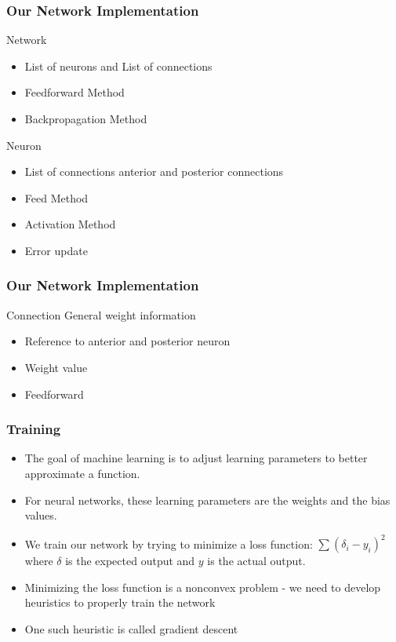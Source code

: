\documentclass{beamer}
\begin{document}
\begin{frame}
\frametitle{Our Network Implementation}
\begin{block}{Network}
    \begin{itemize}
        \item List of neurons and List of connections
        \item Feedforward Method
        \item Backpropagation Method
    \end{itemize}
\end{block}

\begin{block}{Neuron}
    \begin{itemize}
        \item List of connections anterior and posterior connections
        \item Feed Method
        \item Activation Method
        \item Error update
    \end{itemize}
\end{block}
\end{frame}


\begin{frame}
\frametitle{Our Network Implementation}
\begin{block}{Connection}
    General weight information
    \begin{itemize}
        \item Reference to anterior and posterior neuron
        \item Weight value
        \item Feedforward
    \end{itemize}
\end{block}
\end{frame}
\begin{frame}
    \frametitle{Training}
    \begin{itemize}
        \item The goal of machine learning is to adjust learning parameters to better approximate a function.
        \item For neural networks, these learning parameters are the weights and the bias values.
        \item We train our network by trying to minimize a loss function:  $\sum (\delta_{i}-y_{i})^2$ where $\delta$ is the expected output and $y$ is the actual output.
        \item Minimizing the loss function is a nonconvex problem - we need to develop heuristics to properly train the network
        \item One such heuristic is called gradient descent
    \end{itemize}
\end{frame}
\end{document}

